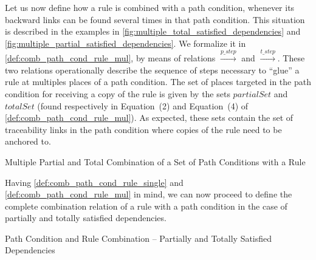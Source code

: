 Let us now define how a rule is combined with a path condition, whenever its backward links can be found several times in that path condition. This situation is described in the examples in \cref{fig:multiple_total_satisfied_dependencies} and \cref{fig:multiple_partial_satisfied_dependencies}. We formalize it in \cref{def:comb_path_cond_rule_mul}, by means of relations $\stackrel{p\_step}{\rightarrow}$ and $\stackrel{t\_step}{\rightarrow}$. These two relations operationally describe the sequence of steps necessary to ``glue'' a rule at multiples places of a path condition. The set of places targeted in the path condition for receiving a copy of the rule is given by the sets $partialSet$ and $totalSet$ (found respectively in Equation~(2) and Equation~(4) of \cref{def:comb_path_cond_rule_mul}). As expected, these sets contain the set of traceability links in the path condition where copies of the rule need to be anchored to.

\begin{definition}{Multiple Partial and Total Combination of a Set of Path Conditions with a Rule\\}
\label{def:comb_path_cond_rule_mul}

\end{definition}

Having \cref{def:comb_path_cond_rule_single} and \cref{def:comb_path_cond_rule_mul} in mind, we can now proceed to define the complete combination relation of a rule with a path condition in the case of partially and totally satisfied dependencies. 

\begin{definition}{Path Condition and Rule Combination -- Partially and Totally Satisfied Dependencies\\}
\label{def:rul_comb_partial_total}

\end{definition}



